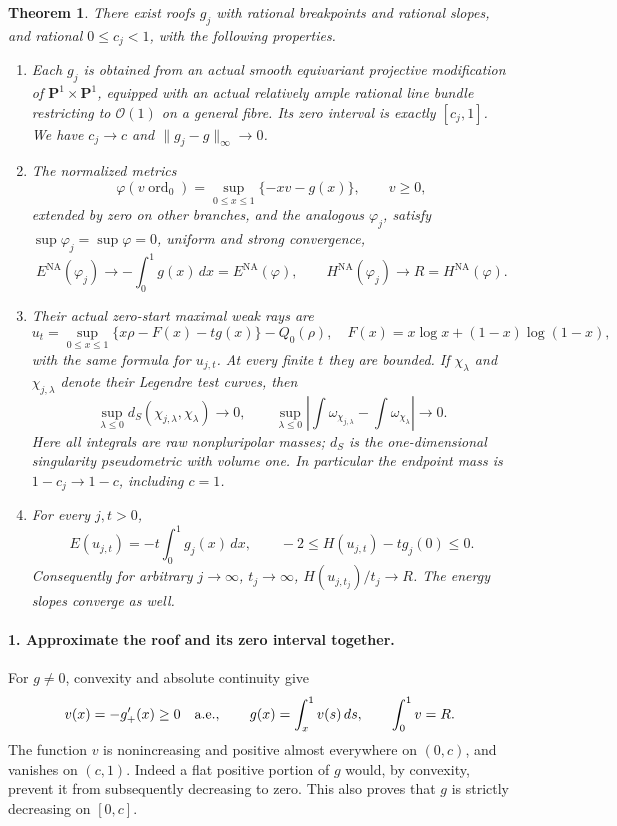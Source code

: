 \documentclass[11pt]{article}
\newtheorem{theorem}{Theorem}
\newcommand{\PP}{\mathbf P}
\newcommand{\NA}{\mathrm{NA}}
\begin{document}
\begin{theorem}\label{thm:main}
There exist roofs $g_j$ with rational breakpoints and rational slopes,
and rational $0\le c_j<1$, with the following properties.
\begin{enumerate}
\item Each $g_j$ is obtained from an actual smooth equivariant
projective modification of $\PP^1\times\PP^1$, equipped with an actual
relatively ample rational line bundle restricting to $\mathcal O(1)$
on a general fibre. Its zero interval is exactly $[c_j,1]$.
We have $c_j\to c$ and $\|g_j-g\|_\infty\to0$.
\item The normalized metrics
\[
 \varphi(v\operatorname{ord}_0)
   =\sup_{0\le x\le1}\{-xv-g(x)\},\qquad v\ge0,
\]
extended by zero on other branches, and the analogous $\varphi_j$,
satisfy $\sup\varphi_j=\sup\varphi=0$, uniform and strong convergence,
\[
 E^\NA(\varphi_j)\to -\int_0^1g(x)\,dx=E^\NA(\varphi),
 \qquad H^\NA(\varphi_j)\to R=H^\NA(\varphi).
\]
\item Their actual zero-start maximal weak rays are
\[
 u_t=\sup_{0\le x\le1}\{x\rho-F(x)-t g(x)\}-Q_0(\rho),
 \quad F(x)=x\log x+(1-x)\log(1-x),
\]
with the same formula for $u_{j,t}$. At every finite $t$ they are
bounded. If $\chi_\lambda$ and $\chi_{j,\lambda}$ denote their
Legendre test curves, then
\[
 \sup_{\lambda\le0}d_S(\chi_{j,\lambda},\chi_\lambda)\longrightarrow0,
 \qquad
 \sup_{\lambda\le0}
 \left|\int\omega_{\chi_{j,\lambda}}-
             \int\omega_{\chi_\lambda}\right|\longrightarrow0.
\]
Here all integrals are raw nonpluripolar masses; $d_S$ is the
one-dimensional singularity pseudometric with volume one.
In particular the endpoint mass is $1-c_j\to1-c$, including $c=1$.
\item For every $j,t>0$,
\[
 E(u_{j,t})=-t\int_0^1g_j(x)\,dx,
 \qquad -2\le H(u_{j,t})-t g_j(0)\le0.
\]
Consequently for arbitrary $j\to\infty$, $t_j\to\infty$,
$H(u_{j,t_j})/t_j\to R$. The energy slopes converge as well.
\end{enumerate}
\end{theorem}

\paragraph{1. Approximate the roof and its zero interval together.}
For $g\ne0$, convexity and absolute continuity give
\[
 v(x)=-g'_+(x)\ge0\quad\hbox{a.e.},\qquad
 g(x)=\int_x^1 v(s)\,ds,\qquad \int_0^1v=R.
\]
The function $v$ is nonincreasing and positive almost everywhere on
$(0,c)$, and vanishes on $(c,1)$. Indeed a flat positive portion of
$g$ would, by convexity, prevent it from subsequently decreasing to
zero. This also proves that $g$ is strictly decreasing on $[0,c]$.
\end{document}
